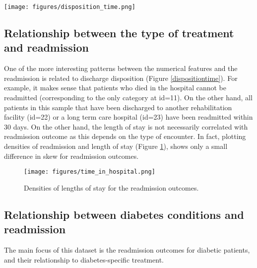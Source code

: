 \documentclass[10pt, twocolumn]{article}
\begin{document}
\begin{figure*}[t!]
	\texttt{[image: figures/disposition\_time.png]}
	\caption{A violin plot showing the relationship between discharge disposition type, length of stay, and readmission.}\label{dispositiontime}
  \end{figure*}

\subsection{Relationship between the type of treatment and readmission}
One of the more interesting patterns between the numerical features and the readmission is related to discharge disposition (Figure \ref{dispositiontime}). For example, it makes sense that patients who died in the hospital cannot be readmitted (corresponding to the only category at id=11). On the other hand, all patients in this sample that have been discharged to another rehabilitation facility (id=22) or a long term care hospital (id=23) have been readmitted within 30 days. On the other hand, the length of stay is not necessarily correlated with readmission outcome as this depends on the type of encounter. In fact, plotting densities of readmission and length of stay (Figure \ref{timeinhospital}), shows only a small difference in skew for readmission outcomes.

\begin{figure}[H]
	\centering
	\texttt{[image: figures/time\_in\_hospital.png]}
	\caption{Densities of lengths of stay for the readmission outcomes.}\label{timeinhospital}
  \end{figure}

\subsection{Relationship between diabetes conditions and readmission}
The main focus of this dataset is the readmission outcomes for diabetic patients, and their relationship to diabetes-specific treatment.






\newpage
\clearpage
\end{document}

